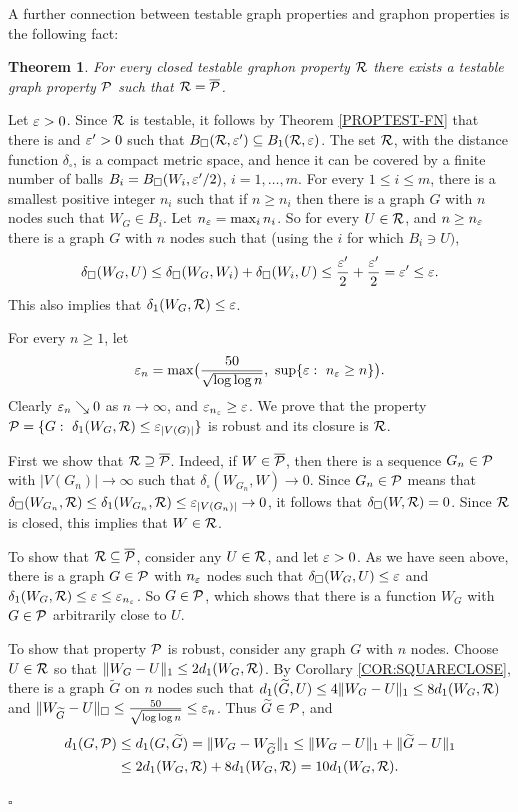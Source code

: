 \documentclass{article}
\newtheorem{theorem}{Theorem}[section]
\newenvironment{proof}{\medskip\noindent{\bf Proof. }}{\hfill$\square$\medskip}
\begin{document}
A further connection between testable graph properties and graphon
properties is the following fact:

\begin{theorem}\label{genprop}
For every closed testable graphon property $\mathcal{R}$ there exists a
testable graph property $\mathcal{P}$ such that $\mathcal{R}=\overline{\mathcal{P}}$.
\end{theorem}

\begin{proof}
Let $\varepsilon>0$. Since $\mathcal{R}$ is testable, it follows by Theorem
\ref{PROPTEST-FN} that there is and $\varepsilon'>0$ such that
$B_{\square}(\mathcal{R},\varepsilon') \subseteq B_1(\mathcal{R},\varepsilon)$. The set $\mathcal{R}$, with
the distance function $\delta_{\square}$, is a compact metric space,
and hence it can be covered by a finite number of balls
$B_i=B_\square(W_i,\varepsilon'/2)$, $i=1,\dots,m$. For every $1\le i\le m$,
there is a smallest positive integer $n_i$ such that if $n\geq n_i$
then there is a graph $G$ with $n$ nodes such that $W_G\in B_i$. Let
$n_{\varepsilon}=\max_i n_i$. So for every $U\in\mathcal{R}$, and $n\ge n_\varepsilon$
there is a graph $G$ with $n$ nodes such that (using the $i$ for
which $B_i\ni U)$,
\[
\delta_\square(W_G,U)\le \delta_\square(W_G,W_i) + \delta_\square(W_i,U)
\le \frac{\varepsilon'}{2}+\frac{\varepsilon'}{2}=\varepsilon'\le\varepsilon.
\]
This also implies that $\delta_1(W_G,\mathcal{R})\le \varepsilon$.

For every $n\ge 1$, let
\[
\varepsilon_n=\max\bigl(\frac{50}{\sqrt{\log\log n}},~\sup\{\varepsilon:~n_\varepsilon \ge
n\}\bigr).
\]
Clearly $\varepsilon_n\searrow 0$ as $n\to\infty$, and $\varepsilon_{n_\varepsilon}\ge
\varepsilon$. We prove that the property
$\mathcal{P}=\{G:~\delta_1(W_G,\mathcal{R})\leq\varepsilon_{|V(G)|}\}$ is robust and its
closure is $\mathcal{R}$.

First we show that $\mathcal{R}\supseteq\overline{\mathcal{P}}$. Indeed, if
$W\in\overline{\mathcal{P}}$, then there is a sequence $G_n\in\mathcal{P}$ with
$|V(G_n)|\to\infty$ such that $\delta_\square(W_{G_n},W)\to 0$. Since
$G_n\in\mathcal{P}$ means that $\delta_\square(W_{G_n},\mathcal{R})\le
\delta_1(W_{G_n},\mathcal{R})\le \varepsilon_{|V(G_n)|}\to 0$, it follows that
$\delta_\square(W,\mathcal{R})= 0$. Since $\mathcal{R}$ is closed, this implies that
$W\in\mathcal{R}$.

To show that $\mathcal{R}\subseteq\overline{\mathcal{P}}$, consider any $U\in\mathcal{R}$,
and let $\varepsilon>0$. As we have seen above, there is a graph $G\in\mathcal{P}$
with $n_\varepsilon$ nodes such that $\delta_\square(W_G,U)\le\varepsilon$ and
$\delta_1(W_G,\mathcal{R})\le\varepsilon\le \varepsilon_{n_\varepsilon}$. So $G\in\mathcal{P}$, which
shows that there is a function $W_G$ with $G\in\mathcal{P}$ arbitrarily close
to $U$.

To show that property $\mathcal{P}$ is robust, consider any graph $G$ with
$n$ nodes. Choose $U\in\mathcal{R}$ so that $\|W_G-U\|_1 \le 2d_1(W_G,\mathcal{R})$.
By Corollary \ref{COR:SQUARECLOSE}, there is a graph $\widetilde{G}$
on $n$ nodes such that $d_1(\widetilde{G},U)\le 4\|W_G-U\|_1 \le
8d_1(W_G,\mathcal{R})$ and $\|W_{\widetilde{G}}-U\|_\square
\le\frac{50}{\sqrt{\log\log n}}\le \varepsilon_n$. Thus
$\widetilde{G}\in\mathcal{P}$, and
\begin{align*}
d_1(G,\mathcal{P}) &\le d_1(G,\widetilde{G})= \|W_G-W_{\widetilde{G}}\|_1 \le
\|W_G-U\|_1 +\|\widetilde{G}-U\|_1\\ &\le 2d_1(W_G,\mathcal{R}) +
8d_1(W_G,\mathcal{R}) = 10d_1(W_G,\mathcal{R}).
\end{align*}


\end{proof}
\end{document}
